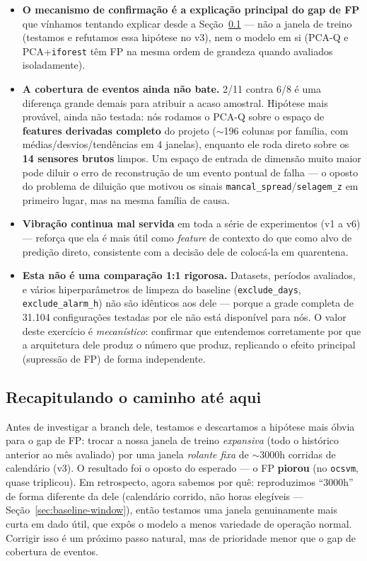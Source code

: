 \documentclass[11pt,a4paper]{article}
\begin{document}
\begin{itemize}[leftmargin=1.4em]
  \item \textbf{O mecanismo de confirmação é a explicação principal do
  gap de FP} que vínhamos tentando explicar desde a Seção~\ref{sec:v3} ---
  não a janela de treino (testamos e refutamos essa hipótese no v3), nem
  o modelo em si (PCA-Q e PCA+\texttt{iforest} têm FP na mesma ordem de
  grandeza quando avaliados isoladamente).
  \item \textbf{A cobertura de eventos ainda não bate.} 2/11 contra 6/8
  é uma diferença grande demais para atribuir a acaso amostral. Hipótese
  mais provável, ainda não testada: nós rodamos o PCA-Q sobre o espaço
  de \textbf{features derivadas completo} do projeto ($\sim$196 colunas
  por família, com médias/desvios/tendências em 4 janelas), enquanto ele
  roda direto sobre os \textbf{14 sensores brutos} limpos. Um espaço de
  entrada de dimensão muito maior pode diluir o erro de reconstrução de
  um evento pontual de falha --- o oposto do problema de diluição que
  motivou os sinais \texttt{mancal\_spread}/\texttt{selagem\_z} em
  primeiro lugar, mas na mesma família de causa.
  \item \textbf{Vibração continua mal servida} em toda a série de
  experimentos (v1 a v6) --- reforça que ela é mais útil como
  \emph{feature} de contexto do que como alvo de predição direto,
  consistente com a decisão dele de colocá-la em quarentena.
  \item \textbf{Esta não é uma comparação 1:1 rigorosa.} Datasets,
  períodos avaliados, e vários hiperparâmetros de limpeza do baseline
  (\texttt{exclude\_days}, \texttt{exclude\_alarm\_h}) não são idênticos
  aos dele --- porque a grade completa de 31.104 configurações testadas
  por ele não está disponível para nós. O valor deste exercício é
  \emph{mecanístico}: confirmar que entendemos corretamente por que a
  arquitetura dele produz o número que produz, replicando o efeito
  principal (supressão de FP) de forma independente.
\end{itemize}

\subsection{Recapitulando o caminho até aqui}
\label{sec:v3}

Antes de investigar a branch dele, testamos e descartamos a hipótese
mais óbvia para o gap de FP: trocar a nossa janela de treino
\emph{expansiva} (todo o histórico anterior ao mês avaliado) por uma
janela \emph{rolante fixa} de $\sim$3000h corridas de calendário (v3).
O resultado foi o oposto do esperado --- o FP \textbf{piorou} (no
\texttt{ocsvm}, quase triplicou). Em retrospecto, agora sabemos por quê:
reproduzimos ``3000h'' de forma diferente da dele (calendário corrido, não
horas elegíveis --- Seção~\ref{sec:baseline-window}), então testamos uma
janela genuinamente mais curta em dado útil, que expôs o modelo a menos
variedade de operação normal. Corrigir isso é um próximo passo natural,
mas de prioridade menor que o gap de cobertura de eventos.
\end{document}
